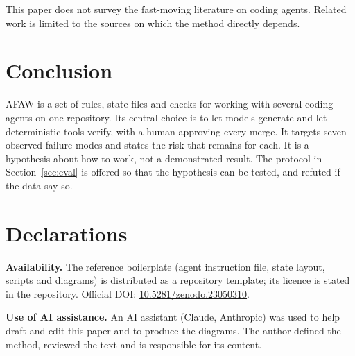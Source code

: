 \documentclass[11pt,a4paper]{article}
\begin{document}
This paper does not survey the fast-moving literature on coding agents. Related work is limited to the sources on which the method directly depends.

\section{Conclusion}

AFAW is a set of rules, state files and checks for working with several coding agents on one repository. Its central choice is to let models generate and let deterministic tools verify, with a human approving every merge. It targets seven observed failure modes and states the risk that remains for each. It is a hypothesis about how to work, not a demonstrated result. The protocol in Section~\ref{sec:eval} is offered so that the hypothesis can be tested, and refuted if the data say so.

\section*{Declarations}

\textbf{Availability.} The reference boilerplate (agent instruction file, state layout, scripts and diagrams) is distributed as a repository template; its licence is stated in the repository. Official DOI: \href{https://doi.org/10.5281/zenodo.23050310}{10.5281/zenodo.23050310}.

\textbf{Use of AI assistance.} An AI assistant (Claude, Anthropic) was used to help draft and edit this paper and to produce the diagrams. The author defined the method, reviewed the text and is responsible for its content.
\end{document}
